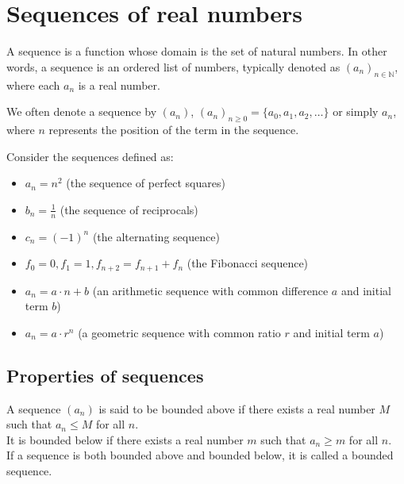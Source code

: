 \chapter{Sequences of real numbers}

\begin{definition}[Sequences]
    A sequence is a function whose domain is the set of natural numbers. In other words, a sequence is an ordered list of numbers, typically denoted as \( (a_n)_{n \in \mathbb{N}} \), where each \( a_n \) is a real number.
\end{definition}
We often denote a sequence by \( (a_n) \), $(a_n)_{n \geq 0} = \{a_0, a_1, a_2, \ldots\}$ or simply \( a_n \), where \( n \) represents the position of the term in the sequence.

\begin{eg}
    Consider the sequences defined as:
    \begin{itemize}[itemsep=1pt,label=$\circ$]
        \item \( a_n = n^2 \) (the sequence of perfect squares)
        \item \( b_n = \frac{1}{n} \) (the sequence of reciprocals)
        \item \( c_n = (-1)^n \) (the alternating sequence)
        \item \( f_0 = 0, f_1 = 1, f_{n + 2} = f_{n + 1} + f_n \) (the Fibonacci sequence)
        \item $a_n = a \cdot n + b $ (an arithmetic sequence with common difference \( a \) and initial term \( b \))
        \item $a_n = a \cdot r^n$ (a geometric sequence with common ratio \( r \) and initial term \( a \))
    \end{itemize}
\end{eg}

\section{Properties of sequences}
\begin{definition}
    A sequence \( (a_n) \) is said to be bounded above if there exists a real number \( M \) such that \( a_n \leq M \) for all \( n \).\\ 
    It is bounded below if there exists a real number \( m \) such that \( a_n \geq m \) for all \( n \). \\
    If a sequence is both bounded above and bounded below, it is called a bounded sequence.
\end{definition}


